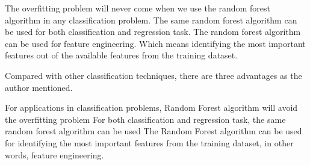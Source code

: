\documentclass[a4paper,12pt]{article}
\begin{document}
The overfitting problem will never come when we use the random forest algorithm in any classification problem.
The same random forest algorithm can be used for both classification and regression task.
The random forest algorithm can be used for feature engineering.
Which means identifying the most important features out of the available features from the training dataset.


Compared with other classification techniques, there are three advantages as the author mentioned.

For applications in classification problems, Random Forest algorithm will avoid the overfitting problem
For both classification and regression task, the same random forest algorithm can be used
The Random Forest algorithm can be used for identifying the most important features from the training dataset, in other words, feature engineering.
\end{document}
